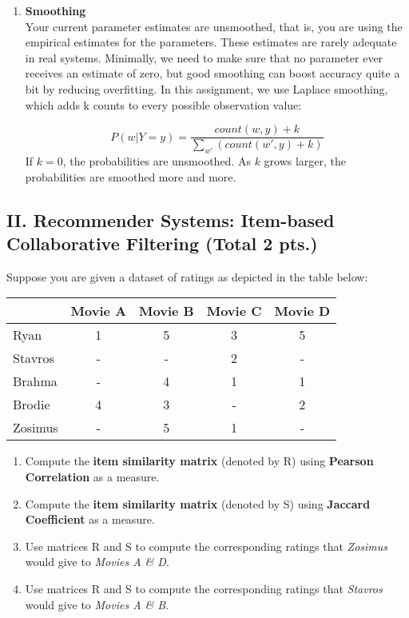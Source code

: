 \documentclass[11pt,a4paper]{article}
\begin{document}
\begin{enumerate}
\item{\textbf{Smoothing}}\\	
Your current parameter estimates are unsmoothed, that is, you are using the empirical estimates for the parameters. These estimates are rarely adequate in real systems. Minimally, we need to make sure that no parameter ever receives an estimate of zero, but good smoothing can boost accuracy quite a bit by reducing overfitting. In this assignment, we use Laplace smoothing, which adds k counts to every possible observation value:

\[ P(w|Y=y) = \frac{count(w , y) + k}{\sum_{w'}{(count(w',y) + k)}}\]
If $k=0$, the probabilities are unsmoothed. As $k$ grows larger, the probabilities are smoothed more and more. \\

\end{enumerate}

\newpage

\subsection*{II. Recommender Systems: Item-based Collaborative Filtering (Total 2 pts.)}
Suppose you are given a dataset of ratings as depicted in the table below: 

\begin{center}
\begin{tabular}{ | l | c | c | c | c |}
    \hline
     & Movie A & Movie B & Movie C & Movie D \\ \hline
     Ryan & 1 & 5 & 3 & 5\\ \hline
     Stavros & - & - & 2 & - \\ \hline
     Brahma & - & 4 & 1 & 1 \\ \hline
     Brodie & 4 & 3 & - & 2\\ \hline
     Zosimus & - & 5 & 1 & - \\ \hline
\end{tabular}
\end{center}

\begin{enumerate}
	\item Compute the \textbf{item similarity matrix} (denoted by R) using \textbf{Pearson Correlation} as a measure. 
	\item Compute the \textbf{item similarity matrix} (denoted by S) using \textbf{Jaccard Coefficient} as a measure.
	\item Use matrices R and S to compute the corresponding ratings that \textit{Zosimus} would give to \textit{Movies A \& D}. 	
	\item Use matrices R and S to compute the corresponding ratings that \textit{Stavros} would give to \textit{Movies A \& B}. 	
\end{enumerate}
\end{document}

